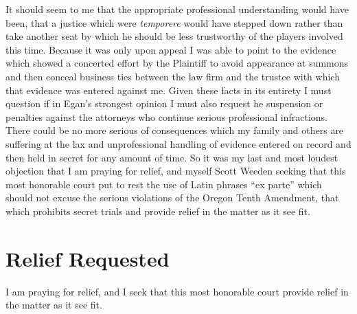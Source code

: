 \documentclass[14pt]{extarticle}
\begin{document}
It should seem to me that the appropriate professional understanding would have been, that a justice which were \emph{temporere} would have stepped down rather than take another seat by which he should be less trustworthy of the players involved this time. Because it was only upon appeal I was able to point to the evidence which showed a concerted effort by the Plaintiff to avoid appearance at summons and then conceal business ties between the law firm and the trustee with which that evidence was entered against me. Given these facts in its entirety I must question if in Egan's strongest opinion I must also request he suspension or penalties against the attorneys who continue serious professional infractions. There could be no more serious of consequences which my family and others are suffering at the lax and unprofessional handling of evidence entered on record and then held in secret for any amount of time. So it was my last and most loudest objection that I am praying for relief, and myself Scott Weeden seeking that this most honorable court put to rest the use of Latin phrases ``ex parte'' which should not excuse the serious violations of the Oregon Tenth Amendment, that which prohibits secret trials and provide relief in the matter as it see fit.

\section*{Relief Requested}
I am praying for relief, and I seek that this most honorable court provide relief in the matter as it see fit.
\end{document}
